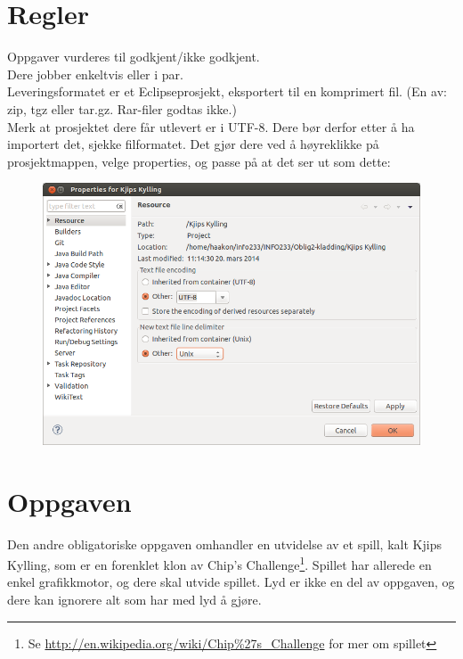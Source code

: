 \documentclass[norsk]{article}
\begin{document}
\blankpage

\section{Regler}
\label{sec:regler}
Oppgaver vurderes til godkjent/ikke godkjent.\\
Dere jobber enkeltvis eller i par.\\
Leveringsformatet er et Eclipseprosjekt, eksportert til en komprimert fil. (En av: zip, tgz eller tar.gz. Rar-filer godtas ikke.)\\ %
Merk at prosjektet dere får utlevert er i UTF-8. Dere bør derfor etter å ha importert det, sjekke filformatet. Det gjør dere ved å høyreklikke på prosjektmappen, velge properties, og passe på at det ser ut som dette:
\begin{figure}[h!]
  \centering
    \includegraphics[width=1\textwidth]{slik-ser-det-ut.png}
\end{figure}


\section{Oppgaven}
\label{sec:oppgaven}
Den andre obligatoriske oppgaven omhandler en utvidelse av et spill, kalt Kjips Kylling, som er en forenklet klon av Chip's Challenge\footnote{Se \url{http://en.wikipedia.org/wiki/Chip\%27s_Challenge} for mer om spillet}.
Spillet har allerede en enkel grafikkmotor, og dere skal utvide spillet.
Lyd er ikke en del av oppgaven, og dere kan ignorere alt som har med lyd å gjøre. %
\end{document}
